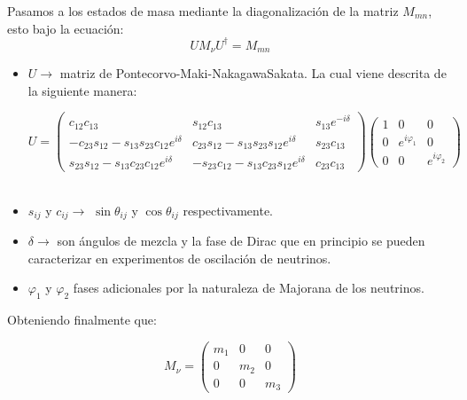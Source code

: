 \documentclass[12pt]{article}
\begin{document}
Pasamos a los estados de masa mediante la diagonalización de la
matriz \( M_{mn} \), esto bajo la ecuación: 
\begin{equation}
   UM_\nu U^\dagger= M_{mn}
\label{eq:23}
\end{equation}

\begin{itemize}
\item \( U \rightarrow \) matriz de Pontecorvo-Maki-NakagawaSakata. La cual viene descrita de la siguiente manera:

\begin{equation}
        U =  \begin{pmatrix}    c_{12}c_{13} & s_{12}c_{13} & s_{13}e^{-i\delta} \\
         -c_{23}s_{12}-s_{13}s_{23}c_{12}e^{i\delta} &  c_{23}s_{12}-s_{13}s_{23}s_{12}e^{i\delta} & s_{23}c_{13}  \\
         s_{23}s_{12}-s_{13}c_{23}c_{12}e^{i\delta} &  -s_{23}c_{12}-s_{13}c_{23}s_{12}e^{i\delta} & c_{23}c_{13}  \end{pmatrix} \begin{pmatrix}   1 & 0 & 0 \\
         0 &  e^{i\varphi_1} & 0  \\
        0 &  0 & e^{i\varphi_2}  \end{pmatrix}
       \label{eq:24}  
\end{equation} \\

\item \( s_{ij}\) y \(c_{ij} \rightarrow \) \( \sin\theta_{ij}  \) y \( \cos\theta_{ij}  \) respectivamente. 
\item \(\delta \rightarrow \)  son ángulos de mezcla y la fase de
Dirac que en principio se pueden caracterizar en experimentos de oscilación de neutrinos.

\item \(\varphi_1 \) y \(\varphi_2 \) fases adicionales por la naturaleza de Majorana de los neutrinos. 

\end{itemize}

Obteniendo finalmente que: 
 
\begin{equation}
    M_\nu=  \begin{pmatrix} m_1& 0 & 0  \\ 0 & m_2 & 0 \\ 0 &0 & m_3   \end{pmatrix} 
\end{equation} 
\end{document}
